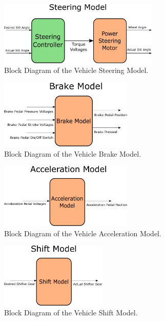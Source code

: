 \documentclass[letterpaper,12pt]{article}   %
\begin{document}
\begin{figure}
    \centering
    \captionsetup{justification=centering, margin=3cm}
    \includegraphics[width=3in]{figs/inkscape/steeringModelArchitecture}
    \caption{Block Diagram of the Vehicle Steering Model.}
    \label{fig:steerBlockDiag}
\end{figure}
%
\begin{figure}
    \centering
    \captionsetup{justification=centering, margin=3cm}
    \includegraphics[width=2.5in]{figs/inkscape/brakeModelArchitecture}
    \caption{Block Diagram of the Vehicle Brake Model.}
    \label{fig:brakeBlockDiag}
\end{figure}
%
\begin{figure}
    \centering
    \captionsetup{justification=centering, margin=3cm}
    \includegraphics[width=2.5in]{figs/inkscape/accelerationModelArchitecture}
    \caption{Block Diagram of the Vehicle Acceleration Model.}
    \label{fig:accelBlockDiag}
\end{figure}
%
\begin{figure}
    \centering
    \captionsetup{justification=centering, margin=3cm}
    \includegraphics[width=2in]{figs/inkscape/shiftModelArchitecture}
    \caption{Block Diagram of the Vehicle Shift Model.}
    \label{fig:shiftBlockDiag}
\end{figure}
\end{document}
